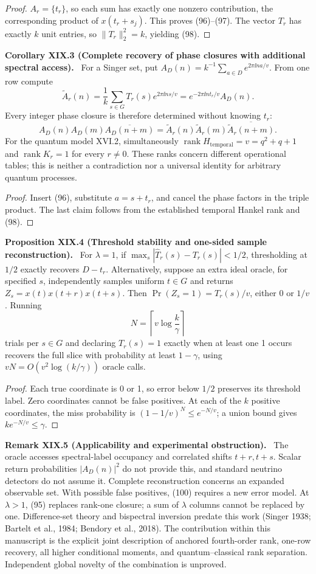 \documentclass[11pt,a4paper,oneside]{book}
\DeclareMathOperator{\rank}{rank}\DeclareMathOperator{\Tr}{Tr}
\newcommand{\statement}[3]{\par\medskip\noindent\textbf{#1 #2 (#3).}\ }
\begin{document}
\begin{proof}$A_r=\{t_r\}$, so each sum has exactly one nonzero contribution, the corresponding product of $x(t_r+s_j)$. This proves (96)--(97). The vector $T_r$ has exactly $k$ unit entries, so $\|T_r\|_2^2=k$, yielding (98).\end{proof}
\statement{Corollary}{XIX.3}{Complete recovery of phase closures with additional spectral access} For a Singer set, put $A_D(n)=k^{-1}\sum_{a\in D}e^{2\pi\ii na/v}$. From one row compute
\[\widetilde A_r(n)=\frac1k\sum_{s\in G}T_r(s)e^{2\pi\ii ns/v}=e^{-2\pi\ii nt_r/v}A_D(n).\]
Every integer phase closure is therefore determined without knowing $t_r$:
\begin{equation}A_D(n)A_D(m)\overline{A_D(n+m)}=\widetilde A_r(n)\widetilde A_r(m)\overline{\widetilde A_r(n+m)}.\tag{99}\end{equation}
For the quantum model XVI.2, simultaneously $\rank H_{\mathrm{temporal}}=v=q^2+q+1$ and $\rank K_r=1$ for every $r\ne0$. These ranks concern different operational tables; this is neither a contradiction nor a universal identity for arbitrary quantum processes.
\begin{proof}Insert (96), substitute $a=s+t_r$, and cancel the phase factors in the triple product. The last claim follows from the established temporal Hankel rank and (98).\end{proof}
\statement{Proposition}{XIX.4}{Threshold stability and one-sided sample reconstruction} For $\lambda=1$, if $\max_s|\widehat T_r(s)-T_r(s)|<1/2$, thresholding at $1/2$ exactly recovers $D-t_r$. Alternatively, suppose an extra ideal oracle, for specified $s$, independently samples uniform $t\in G$ and returns $Z_s=x(t)x(t+r)x(t+s)$. Then $\Pr(Z_s=1)=T_r(s)/v$, either 0 or $1/v$. Running
\begin{equation}N=\left\lceil v\log\frac k\gamma\right\rceil\tag{100}\end{equation}
trials per $s\in G$ and declaring $T_r(s)=1$ exactly when at least one 1 occurs recovers the full slice with probability at least $1-\gamma$, using $vN=O(v^2\log(k/\gamma))$ oracle calls.
\begin{proof}Each true coordinate is 0 or 1, so error below $1/2$ preserves its threshold label. Zero coordinates cannot be false positives. At each of the $k$ positive coordinates, the miss probability is $(1-1/v)^N\le e^{-N/v}$; a union bound gives $ke^{-N/v}\le\gamma$.\end{proof}
\statement{Remark}{XIX.5}{Applicability and experimental obstruction} The oracle accesses spectral-label occupancy and correlated shifts $t+r,t+s$. Scalar return probabilities $|A_D(n)|^2$ do not provide this, and standard neutrino detectors do not assume it. Complete reconstruction concerns an expanded observable set. With possible false positives, (100) requires a new error model. At $\lambda>1$, (95) replaces rank-one closure; a sum of $\lambda$ columns cannot be replaced by one. Difference-set theory and bispectral inversion predate this work (Singer 1938; Bartelt et al., 1984; Bendory et al., 2018). The contribution within this manuscript is the explicit joint description of anchored fourth-order rank, one-row recovery, all higher conditional moments, and quantum--classical rank separation. Independent global novelty of the combination is unproved.
\end{document}
